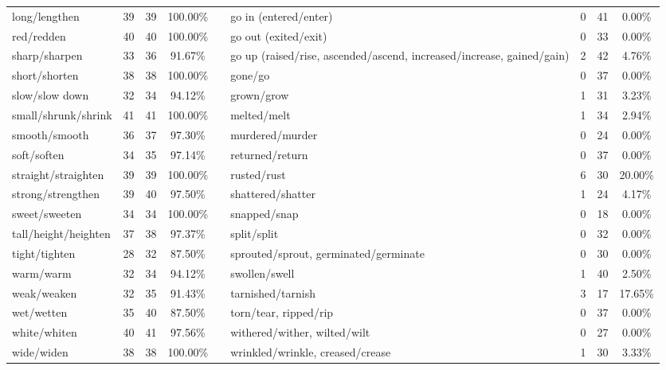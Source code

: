\begin{tabular}{p{3cm}ccccp{3cm}ccc}
long/lengthen & 39 & 39 & 100.00\% & & go in (entered/enter) & 0 & 41 & 0.00\% \\
red/redden & 40 & 40 & 100.00\% & & go out (exited/exit) & 0 & 33 & 0.00\% \\
sharp/sharpen & 33 & 36 & 91.67\% & & go up (raised/rise, ascended/ascend, increased/increase, gained/gain) & 2 & 42 & 4.76\% \\
short/shorten & 38 & 38 & 100.00\% & & gone/go & 0 & 37 & 0.00\% \\
slow/slow down & 32 & 34 & 94.12\% & & grown/grow & 1 & 31 & 3.23\% \\
small/shrunk/shrink & 41 & 41 & 100.00\% & & melted/melt & 1 & 34 & 2.94\% \\
smooth/smooth & 36 & 37 & 97.30\% & & murdered/murder & 0 & 24 & 0.00\% \\
soft/soften & 34 & 35 & 97.14\% & & returned/return & 0 & 37 & 0.00\% \\
straight/straighten & 39 & 39 & 100.00\% & & rusted/rust & 6 & 30 & 20.00\% \\
strong/strengthen & 39 & 40 & 97.50\% & & shattered/shatter & 1 & 24 & 4.17\% \\
sweet/sweeten & 34 & 34 & 100.00\% & & snapped/snap & 0 & 18 & 0.00\% \\
tall/height/heighten & 37 & 38 & 97.37\% & & split/split & 0 & 32 & 0.00\% \\
tight/tighten & 28 & 32 & 87.50\% & & sprouted/sprout, germinated/germinate & 0 & 30 & 0.00\% \\
warm/warm & 32 & 34 & 94.12\% & & swollen/swell & 1 & 40 & 2.50\% \\
weak/weaken & 32 & 35 & 91.43\% & & tarnished/tarnish & 3 & 17 & 17.65\% \\
wet/wetten & 35 & 40 & 87.50\% & & torn/tear, ripped/rip & 0 & 37 & 0.00\% \\
white/whiten & 40 & 41 & 97.56\% & & withered/wither, wilted/wilt & 0 & 27 & 0.00\% \\
wide/widen & 38 & 38 & 100.00\% & & wrinkled/wrinkle, creased/crease & 1 & 30 & 3.33\%
\end{tabular}